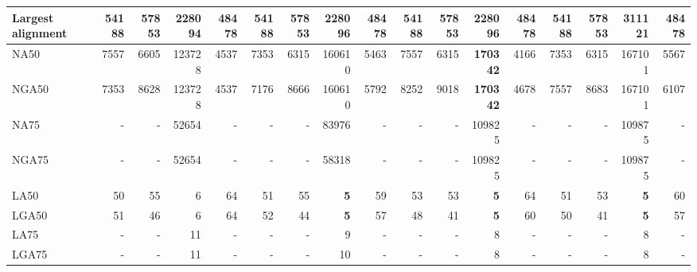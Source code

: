 \documentclass[12pt,a4paper]{article}
\begin{document}
\begin{table}[ht]
\begin{center}
\begin{tabular}{|l*{16}{|r}|}
Largest alignment & 54188 & 57853 & 228094 & 48478 & 54188 & 57853 & 228096 & 48478 & 54188 & 57853 & 228096 & 48478 & 54188 & 57853 & {\bf 311121} & 48478 \\ \hline
NA50 & 7557 & 6605 & 123728 & 4537 & 7353 & 6315 & 160610 & 5463 & 7557 & 6315 & {\bf 170342} & 4166 & 7353 & 6315 & 167101 & 5567 \\ \hline
NGA50 & 7353 & 8628 & 123728 & 4537 & 7176 & 8666 & 160610 & 5792 & 8252 & 9018 & {\bf 170342} & 4678 & 7557 & 8683 & 167101 & 6107 \\ \hline
NA75 & - & - & 52654 & - & - & - & 83976 & - & - & - & 109825 & - & - & - & 109875 & - \\ \hline
NGA75 & - & - & 52654 & - & - & - & 58318 & - & - & - & 109825 & - & - & - & 109875 & - \\ \hline
LA50 & 50 & 55 & 6 & 64 & 51 & 55 & {\bf 5} & 59 & 53 & 53 & {\bf 5} & 64 & 51 & 53 & {\bf 5} & 60 \\ \hline
LGA50 & 51 & 46 & 6 & 64 & 52 & 44 & {\bf 5} & 57 & 48 & 41 & {\bf 5} & 60 & 50 & 41 & {\bf 5} & 57 \\ \hline
LA75 & - & - & 11 & - & - & - & 9 & - & - & - & 8 & - & - & - & 8 & - \\ \hline
LGA75 & - & - & 11 & - & - & - & 10 & - & - & - & 8 & - & - & - & 8 & - \\ \hline
\end{tabular}
\end{center}
\end{table}
\end{document}
